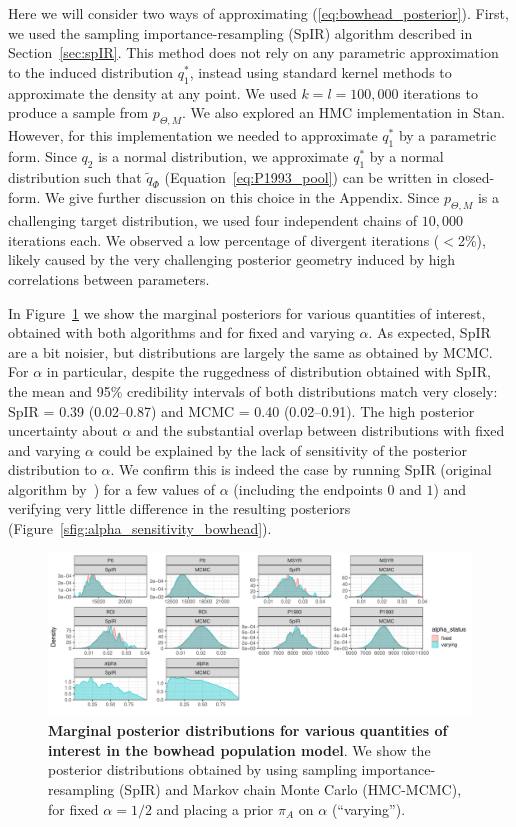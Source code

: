 \documentclass[a4paper, notitlepage, 10pt]{article}
\begin{document}
Here we will consider two ways of approximating (\ref{eq:bowhead_posterior}).
First, we used the sampling importance-resampling (SpIR) algorithm described in Section~\ref{sec:spIR}.
This method does not rely on any parametric approximation to the induced distribution $q_1^\ast$, instead using standard kernel methods to approximate the density at any point.
We used $k = l = 100, 000$ iterations to produce a sample from $p_{\Theta, M}$.
We also explored an HMC implementation in Stan.
However, for this implementation we needed to approximate $q_1^\ast$ by a parametric form.
Since $q_2$ is a normal distribution, we approximate $q_1^\ast$ by a normal distribution such that $\tilde{q}_{\Phi}$ (Equation~\ref{eq:P1993_pool}) can be written in closed-form.
We give further discussion on this choice in the Appendix.
Since $p_{\Theta, M}$ is a challenging target distribution, we used four independent chains of  $10,000$ iterations each.
We observed a low percentage of divergent iterations ($<$2\%), likely caused by the very challenging posterior geometry induced by high correlations between parameters.

In Figure~\ref{fig:bowhead_marginal_posteriors} we show the marginal posteriors for various quantities of interest, obtained with both algorithms and for fixed and varying $\alpha$.
As expected, SpIR are a bit noisier, but distributions are largely the same as obtained by MCMC.
For $\alpha$ in particular, despite the ruggedness of distribution obtained with SpIR, the mean and 95\% credibility intervals of both distributions match very closely: SpIR = 0.39 (0.02--0.87) and MCMC = 0.40 (0.02--0.91).
The high posterior uncertainty about $\alpha$ and the substantial overlap between distributions with fixed and varying $\alpha$ could be explained by the lack of sensitivity of the posterior distribution to $\alpha$.
We confirm this is indeed the case by running SpIR (original algorithm by~\cite{poole2000}) for a few values of $\alpha$ (including the endpoints $0$ and $1$) and verifying very little difference in the resulting posteriors (Figure~\ref{sfig:alpha_sensitivity_bowhead}). 
\begin{figure}[!ht]
\begin{center}
\includegraphics[scale=.45]{../plots/bowhead_posteriors.pdf}
\end{center}
\caption{\textbf{Marginal posterior distributions for various quantities of interest in the bowhead population model}.
We show the posterior distributions obtained by using sampling importance-resampling (SpIR) and Markov chain Monte Carlo (HMC-MCMC), for fixed $\alpha = 1/2$ and placing a prior $\pi_A$ on $\alpha$ (``varying'').
}
\label{fig:bowhead_marginal_posteriors}
\end{figure}
\end{document}
